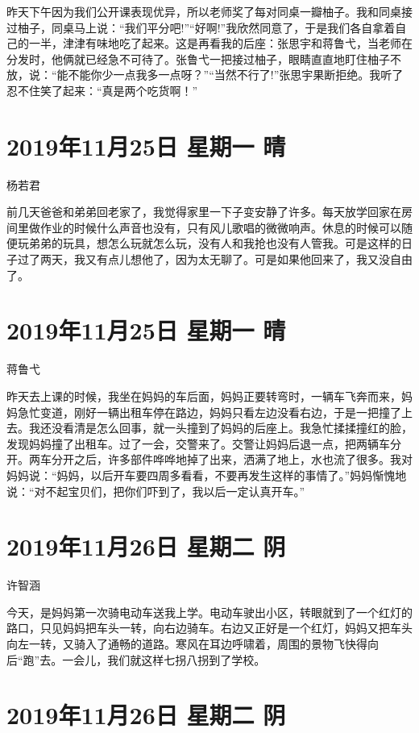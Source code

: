 昨天下午因为我们公开课表现优异，所以老师奖了每对同桌一瓣柚子。我和同桌接过柚子，同桌马上说：``我们平分吧!''``好啊!''我欣然同意了，于是我们各自拿着自己的一半，津津有味地吃了起来。这是再看我的后座：张思宇和蒋鲁弋，当老师在分发时，他俩就已经急不可待了。张鲁弋一把接过柚子，眼睛直直地盯住柚子不放，说：``能不能你少一点我多一点呀？''``当然不行了!''张思宇果断拒绝。我听了忍不住笑了起来：``真是两个吃货啊！''

\section{2019年11月25日 星期一 晴}

杨若君

前几天爸爸和弟弟回老家了，我觉得家里一下子变安静了许多。每天放学回家在房间里做作业的时候什么声音也没有，只有风儿歌唱的微微响声。休息的时候可以随便玩弟弟的玩具，想怎么玩就怎么玩，没有人和我抢也没有人管我。可是这样的日子过了两天，我又有点儿想他了，因为太无聊了。可是如果他回来了，我又没自由了。

\section{2019年11月25日 星期一 晴}

蒋鲁弋

昨天去上课的时候，我坐在妈妈的车后面，妈妈正要转弯时，一辆车飞奔而来，妈妈急忙变道，刚好一辆出租车停在路边，妈妈只看左边没看右边，于是一把撞了上去。我还没看清是怎么回事，就一头撞到了妈妈的后座上。我急忙揉揉撞红的脸，发现妈妈撞了出租车。过了一会，交警来了。交警让妈妈后退一点，把两辆车分开。两车分开之后，许多部件哗哗地掉了出来，洒满了地上，水也流了很多。我对妈妈说：``妈妈，以后开车要四周多看看，不要再发生这样的事情了。''妈妈惭愧地说：``对不起宝贝们，把你们吓到了，我以后一定认真开车。''

\section{2019年11月26日 星期二 阴}

许智涵

今天，是妈妈第一次骑电动车送我上学。电动车驶出小区，转眼就到了一个红灯的路口，只见妈妈把车头一转，向右边骑车。右边又正好是一个红灯，妈妈又把车头向左一转，又骑入了通畅的道路。寒风在耳边呼啸着，周围的景物飞快得向后``跑''去。一会儿，我们就这样七拐八拐到了学校。

\section{2019年11月26日 星期二 阴}

